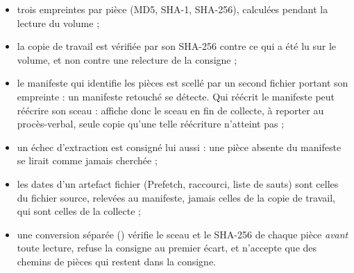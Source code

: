 \documentclass[11pt,a4paper,oneside]{report}
\begin{document}
\begin{itemize}
  \item trois empreintes par pièce (MD5, SHA-1, SHA-256), calculées pendant la
    lecture du volume ;
  \item la copie de travail est vérifiée par son SHA-256 contre ce qui a été
    lu sur le volume, et non contre une relecture de la consigne ;
  \item le manifeste qui identifie les pièces est scellé par un second fichier
    portant son empreinte : un manifeste retouché se détecte. Qui réécrit le
    manifeste peut réécrire son sceau : \wac{} affiche donc le sceau en fin de
    collecte, à reporter au procès-verbal, seule copie qu'une telle réécriture
    n'atteint pas ;
  \item un échec d'extraction est consigné lui aussi : une pièce absente du
    manifeste se lirait comme jamais cherchée ;
  \item les dates d'un artefact fichier (Prefetch, raccourci, liste de sauts)
    sont celles du fichier source, relevées au manifeste, jamais celles de la
    copie de travail, qui sont celles de la collecte ;
  \item une conversion séparée () vérifie le sceau et le
    SHA-256 de chaque pièce \emph{avant} toute lecture, refuse la consigne au
    premier écart, et n'accepte que des chemins de pièces qui restent dans la
    consigne.
\end{itemize}
\end{document}
